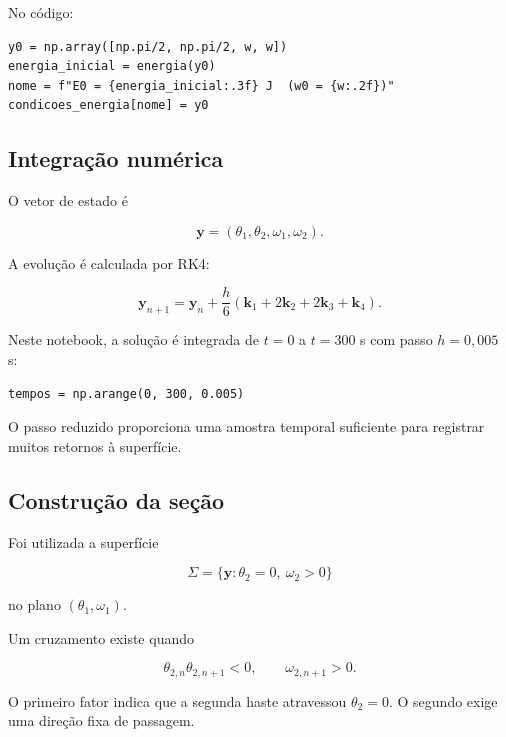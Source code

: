 \documentclass[12pt,a4paper]{article}
\begin{document}
No código:

\begin{lstlisting}
y0 = np.array([np.pi/2, np.pi/2, w, w])
energia_inicial = energia(y0)
nome = f"E0 = {energia_inicial:.3f} J  (w0 = {w:.2f})"
condicoes_energia[nome] = y0
\end{lstlisting}

\subsection{Integração numérica}

O vetor de estado é

\begin{equation}
\mathbf y=(\theta_1,\theta_2,\omega_1,\omega_2).
\end{equation}

A evolução é calculada por RK4:

\begin{equation}
\mathbf y_{n+1}
=
\mathbf y_n+
\frac h6\left(\mathbf k_1+2\mathbf k_2+2\mathbf k_3+\mathbf k_4\right).
\end{equation}

Neste notebook, a solução é integrada de $t=0$ a $t=300$ s com passo $h=0{,}005$ s:

\begin{lstlisting}
tempos = np.arange(0, 300, 0.005)
\end{lstlisting}

O passo reduzido proporciona uma amostra temporal suficiente para registrar muitos retornos à superfície.

\subsection{Construção da seção}

Foi utilizada a superfície

\begin{equation}
\Sigma=\{\mathbf y:\theta_2=0,\ \omega_2>0\}
\end{equation}

no plano $(\theta_1,\omega_1)$.

Um cruzamento existe quando

\begin{equation}
\theta_{2,n}\theta_{2,n+1}<0,
\qquad
\omega_{2,n+1}>0.
\end{equation}

O primeiro fator indica que a segunda haste atravessou $\theta_2=0$. O segundo exige uma direção fixa de passagem.
\end{document}
